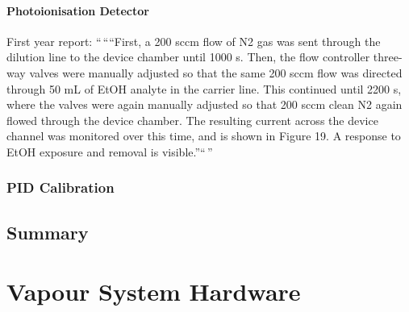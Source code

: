 \documentclass[
  a4paper,
]{scrbook}
\begin{document}
\hypertarget{photoionisation-detector-1}{%
\subsubsection*{Photoionisation
Detector}\label{photoionisation-detector-1}}

First year report: ``\,````First, a 200 sccm flow of N2 gas was sent
through the dilution line to the device chamber until 1000 s. Then, the
flow controller three-way valves were manually adjusted so that the same
200 sccm flow was directed through 50 mL of EtOH analyte in the carrier
line. This continued until 2200 s, where the valves were again manually
adjusted so that 200 sccm clean N2 again flowed through the device
chamber. The resulting current across the device channel was monitored
over this time, and is shown in Figure 19. A response to EtOH exposure
and removal is visible.''``\,''

\hypertarget{pid-calibration}{%
\subsection{PID Calibration}\label{pid-calibration}}

\hypertarget{summary}{%
\section{Summary}\label{summary}}

\cleardoublepage
{}
{}
\appendix

\hypertarget{sec-vapour-sensor-components}{%
\chapter{Vapour System Hardware}\label{sec-vapour-sensor-components}}
\end{document}
